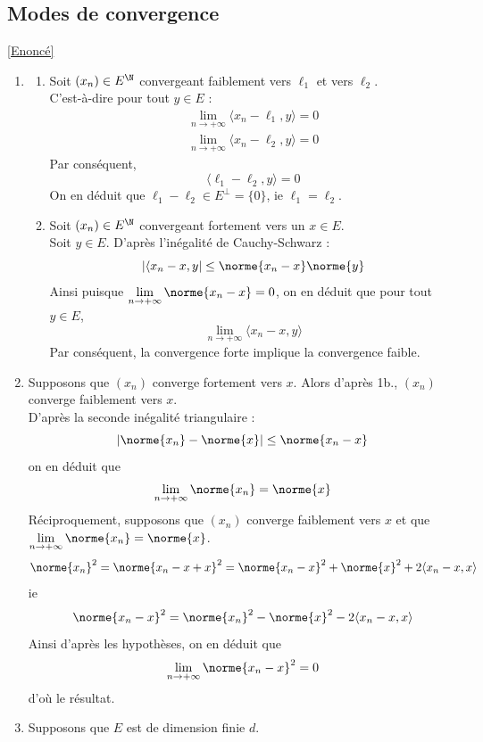 \documentclass{book}
\begin{document}
	\subsection{Modes de convergence}\label{sec:modes-de-convergence}
		\textcolor{blue}{\hyperref[Modes de convergence]{[Enoncé]}}\\
		\begin{enumerate}
			\item \begin{enumerate}[label=\alph*.]
				\item Soit $(x_n)\in E^\N$ convergeant faiblement vers $\ell_1$ et vers $\ell_2$.\\
				C'est-à-dire pour tout $y\in E$ :
				\begin{align*}
					\lim\limits_{n\to+\infty}\langle x_n-\ell_1,y\rangle=0\\
					\lim\limits_{n\to+\infty}\langle x_n-\ell_2,y\rangle=0
				\end{align*}
				Par conséquent, \[\langle \ell_1-\ell_2,y\rangle=0\]
				On en déduit que $\ell_1-\ell_2\in E^\perp=\{0\}$, ie $\ell_1=\ell_2$.
				\item Soit $(x_n)\in E^\N$ convergeant fortement vers un $x\in E$.\\
				Soit $y\in E$. D'après l'inégalité de Cauchy-Schwarz :
				\[|\langle x_n-x,y|\leq\norme{x_n-x}\norme{y}\]
				Ainsi puisque $\lim\limits_{n\to+\infty}\norme{x_n-x}=0$, on en déduit que pour tout $y\in E$, \[\lim\limits_{n\to+\infty}\langle x_n-x,y\rangle\]
				Par conséquent, la convergence forte implique la convergence faible.
			\end{enumerate}
			\item Supposons que $(x_n)$ converge fortement vers $x$.
			Alors d'après 1b., $(x_n)$ converge faiblement vers $x$.\\
			D'après la seconde inégalité triangulaire :
			\[|\norme{x_n}-\norme{x}|\leq\norme{x_n-x}\]
			on en déduit que \[\lim\limits_{n\to+\infty}\norme{x_n}=\norme{x}\]
			Réciproquement, supposons que $(x_n)$ converge faiblement vers $x$ et que $\lim\limits_{n\to+\infty}\norme{x_n}=\norme{x}$.\\
			\[\norme{x_n}^2=\norme{x_n-x+x}^2=\norme{x_n-x}^2+\norme{x}^2+2\langle x_n-x,x\rangle\]
			ie \[\norme{x_n-x}^2=\norme{x_n}^2-\norme{x}^2-2\langle x_n-x,x\rangle\]
			Ainsi d'après les hypothèses, on en déduit que \[\lim\limits_{n\to+\infty}\norme{x_n-x}^2=0\]
			d'où le résultat.
			\item Supposons que $E$ est de dimension finie $d$.\\

\end{enumerate}
\end{document}
